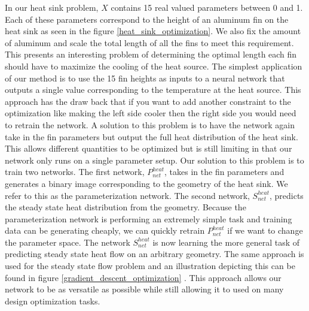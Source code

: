 \documentclass{article} %
\begin{document}
In our heat sink problem, $X$ contains 15 real valued parameters between 0 and 1. Each of these parameters correspond to the height of an aluminum fin on the heat sink as seen in the figure \ref{heat_sink_optimization}. We also fix the amount of aluminum and scale the total length of all the fins to meet this requirement. This presents an interesting problem of determining the optimal length each fin should have to maximize the cooling of the heat source. The simplest application of our method is to use the 15 fin heights as inputs to a neural network that outputs a single value corresponding to the temperature at the heat source. This approach has the draw back that if you want to add another constraint to the optimization like making the left side cooler then the right side you would need to retrain the network. A solution to this problem is to have the network again take in the fin parameters but output the full heat distribution of the heat sink. This allows different quantities to be optimized but is still limiting in that our network only runs on a single parameter setup. Our solution to this problem is to train two networks. The first network, $P^{heat}_{net}$, takes in the fin parameters and generates a binary image corresponding to the geometry of the heat sink. We refer to this as the parameterization network. The second network, $S^{heat}_{net}$, predicts the steady state heat distribution from the geometry. Because the parameterization network is performing an extremely simple task and training data can be generating cheaply, we can quickly retrain $P^{heat}_{net}$ if we want to change the parameter space. The network $S^{heat}_{net}$ is now learning the more general task of predicting steady state heat flow on an arbitrary geometry. The same approach is used for the steady state flow problem and an illustration depicting this can be found in figure \ref{gradient_descent_optimization} . This approach allows our network to be as versatile as possible while still allowing it to used on many design optimization tasks.
\end{document}

